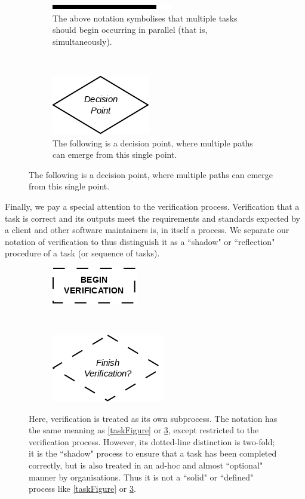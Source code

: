 \begin{figure}[h!]
\centering
\begin{subfigure}[b]{.45\textwidth}
\centering
\includegraphics[scale=0.6]{media/Parallelised}
\caption{The above notation symbolises that multiple tasks should begin occurring in parallel (that
		is, simultaneously).}
\label{parFigure}
\end{subfigure}
~
\begin{subfigure}[b]{.45\textwidth}
\centering
\includegraphics[scale=0.6]{media/Branching}
\caption{The following is a decision point, where multiple paths can emerge from this single point.}
\label{branFigure}
\end{subfigure}
\end{figure}

\pagebreak %

Finally, we pay a special attention to the verification process.
Verification that a task is correct and its outputs meet the requirements and standards expected by a client
and other software maintainers is, in itself a process.
We separate our notation of verification to thus distinguish it as a ``shadow" or ``reflection"
procedure of a task (or sequence of tasks).

\begin{figure}[h!]
\centering
\begin{subfigure}[b]{.45\textwidth}
\centering
\includegraphics[scale=0.6]{media/BeginVerification}
\end{subfigure}
~
\begin{subfigure}[b]{.45\textwidth}
\centering
\includegraphics[scale=0.6]{media/EndVerification}
\end{subfigure}
\caption{Here, verification is treated as its own subprocess. The notation has the same meaning as
	\ref{taskFigure} or \ref{branFigure}, except restricted to the verification process.
	However, its dotted-line distinction is
	two-fold; it is the ``shadow" process to ensure that a task has been completed correctly, but is
		also treated in an ad-hoc and almost ``optional" manner by organisations.
		Thus it is not a ``solid" or ``defined" process like \ref{taskFigure} or \ref{branFigure}.}
\label{verification}
\end{figure}

